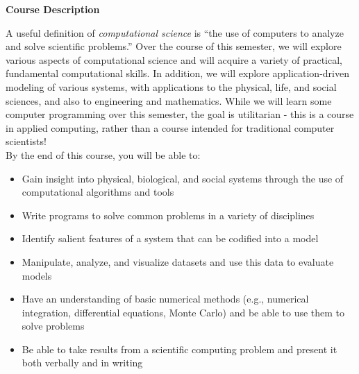 \documentclass[oneside,letterpaper,11pt]{exam}
\begin{document}
 

\pointsinmargin

\begin{center}
	\vspace{5pt}
	\textbf{Course Description}
	\vspace{5pt}
\end{center}
{\noindent
A useful definition of \emph{computational science} is ``the use of computers to analyze and solve scientific problems.'' Over the course of this semester, we will explore various aspects of computational science and will acquire a variety of practical, fundamental computational skills. In addition, we will explore application-driven modeling of various systems, with applications to the physical, life, and social sciences, and also to engineering and mathematics. While we will learn some computer programming over this semester, the goal is utilitarian - this is a course in applied computing, rather than a course intended for traditional computer scientists!} \\

{\noindent By the end of this course, you will be able to:}
\begin{itemize}
\item[1.] Gain insight into physical, biological, and social systems through the use of computational algorithms and tools\\[-15pt]
\item[2.] Write programs to solve common problems in a variety of disciplines\\[-15pt]
\item[3.] Identify salient features of a system that can be codified into a model\\[-15pt]
\item[4.] Manipulate, analyze, and visualize datasets and use this data to evaluate models\\[-15pt]
\item[5.] Have an understanding of basic numerical methods (e.g., numerical integration, differential equations, Monte Carlo) and be able to use them to solve problems\\[-15pt]
\item[6.] Be able to take results from a scientific computing problem and present it both verbally and in writing
\end{itemize}
\end{document}
